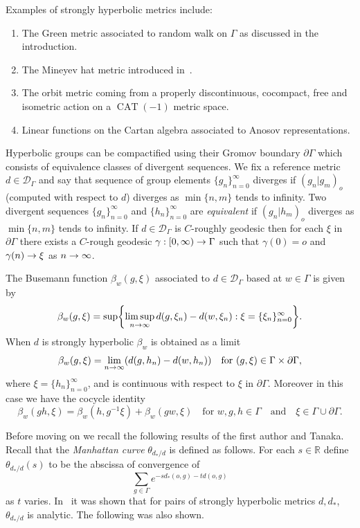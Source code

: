 \documentclass[AHL,Unicode,longabstracts,published]{cedram}
\renewcommand{\b}{\beta}
\newcommand{\g}{\gamma}
\newcommand{\G}{\Gamma}
\newcommand{\x}{\xi}
\newcommand{\Dc}{\mathcal{D}}
\newcommand{\R}{\mathbb{R}}
\DeclareMathOperator{\CAT}{CAT}
\let\originalleft\left
\let\originalright\right
\renewcommand{\left}{\mathopen{}\mathclose\bgroup\originalleft}
\renewcommand{\right}{\aftergroup\egroup\originalright}
\renewcommand*{\to}{\mathchoice{\longrightarrow}{\rightarrow}{\rightarrow}{\rightarrow}}
\newcounter{setofcase}
\newcounter{case}[setofcase]
\theoremstyle{plain}
\newcommand{\G}{\Gamma}
\begin{document}
\begin{rema}
Examples of strongly hyperbolic metrics include:
\begin{enumerate}
\item The Green metric associated to random walk on $\G$ as discussed in the introduction.

\item The Mineyev hat metric introduced in~\cite{MineyevFlow}.

\item The orbit metric coming from a properly discontinuous, cocompact, free and isometric action on a $\CAT(-1)$ metric space.

\item Linear functions on the Cartan algebra associated to Anosov representations.
\end{enumerate}
\end{rema}

Hyperbolic groups can be compactified using their Gromov boundary $\partial \G$ which consists of equivalence classes of divergent sequences. We fix a reference metric $d \in \Dc_\G$ and say that sequence of group elements $\{g_n\}_{n=0}^\infty$ diverges if $(g_n|g_m)_o$ (computed with respect to $d$) diverges as $\min\{n, m\}$ tends to infinity. Two divergent sequences $\{g_n\}_{n=0}^\infty$ and $\{h_n\}_{n=0}^\infty$ are \emph{equivalent} if $(g_n|h_m)_o$ diverges as $\min\{n, m\}$ tends to infinity. If $d \in \Dc_\G$ is $C$-roughly geodesic then for each $\x$ in $\partial \G$ there exists a $C$-rough geodesic $\g:[0, \infty) \to \G$ such that $\g(0)=o$ and $\g(n) \to \x$ as $n \to \infty$.

The Busemann function $ \beta_w(g, \x)$ associated to $d \in \Dc_\G$ based at $w \in \G$ is given by
\[
\beta_w(g,\x) = \sup\left\{ \limsup_{n\to\infty} d(g,\x_n) - d(w,\xi_n) : \x = \{ \x_n\}_{n=0}^\infty \right\}.
\]
When $d$ is strongly hyperbolic $\beta_w$ is obtained as a limit
\[
\b_w(g, \x)=\lim_{n \to \infty}\left(d(g, h_n)- d(w, h_n)\right) \quad \text{for }(g, \x) \in \G \times \partial \G,
\]
where $\x=\{h_n\}_{n=0}^\infty$, and is continuous with respect to $\x$ in $\partial \G$. Moreover in this case we have the cocycle identity
\[
\b_w(gh, \x)= \b_w(h, g^{-1}\x)+ \b_w(g w, \x) \quad \text{for }w, g, h \in \G\quad\text{and}\quad\x\in\G\cup \partial \G.
\]

Before moving on we recall the following results of the first author and Tanaka. Recall that the \emph{Manhattan curve} $\theta_{d_\ast/d}$ is defined as follows. For each $s \in \R$ define $\theta_{d_\ast/d}(s)$ to be the abscissa of convergence of
\[
\sum_{g\in\G} e^{-sd_\ast(o,g) - td(o,g)}
\]
as $t$ varies. In~\cite{cantrell.tanaka.2,cantrell.tanaka.1} it was shown that for pairs of strongly hyperbolic metrics $d,d_\ast$, $\theta_{d_\ast/d}$ is analytic. The following was also shown.
\end{document}
